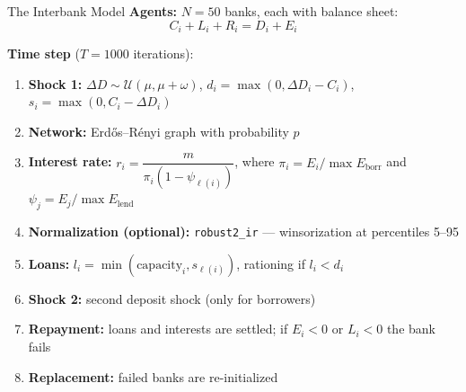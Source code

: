 \documentclass[11pt]{beamer}
\begin{document}
\begin{frame}{The Interbank Model}
\small
\noindent\textbf{Agents:} $N=50$ banks, each with balance sheet:
\[
C_i + L_i + R_i = D_i + E_i
\]

\medskip
\noindent\textbf{Time step} ($T=1000$ iterations):
\begin{enumerate}
    \item \textbf{Shock 1:} $\Delta D \sim \mathcal{U}(\mu, \mu + \omega)$,
          $d_i = \max(0, \Delta D_i - C_i)$, $s_i = \max(0, C_i - \Delta D_i)$
    \item \textbf{Network:} Erdős--Rényi graph with probability $p$
    \item \textbf{Interest rate:} $r_i = \dfrac{m}{\pi_i (1 - \psi_{\ell(i)})}$,
          where $\pi_i = E_i / \max E_{\text{borr}}$ and $\psi_j = E_j / \max E_{\text{lend}}$
    \item \textbf{Normalization (optional):} \texttt{robust2\_ir} — winsorization at percentiles 5--95
    \item \textbf{Loans:} $l_i = \min(\text{capacity}_i, s_{\ell(i)})$,
          rationing if $l_i < d_i$
    \item \textbf{Shock 2:} second deposit shock (only for borrowers)
    \item \textbf{Repayment:} loans and interests are settled;
          if $E_i < 0$ or $L_i < 0$ the bank fails
    \item \textbf{Replacement:} failed banks are re-initialized
\end{enumerate}
\end{frame}
\end{document}
